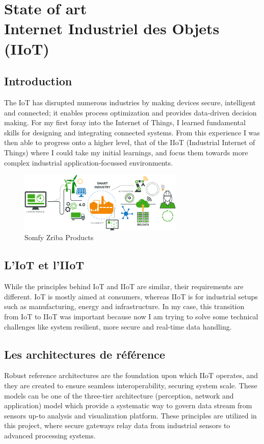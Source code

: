 
\chapter{ State of art \\
Internet Industriel des Objets (IIoT)}
\section{Introduction}
The IoT has disrupted numerous industries by making devices secure, intelligent and connected; it enables process optimization and provides data-driven decision making. For my first foray into the Internet of Things, I learned fundamental skills for designing and integrating connected systems. From this experience I was then able to progress onto a higher level, that of the IIoT (Industrial Internet of Things) where I could take my initial learnings, and focus them towards more complex industrial application-focussed environments.
\begin{figure}[H]
    \centering
    \includegraphics[width=0.7\textwidth]{chapters/N-1/img/what-is-industrial-Internet-of-things-1080x396.png}
    \caption{Somfy Zriba Products}
    \label{fig:campus}
\end{figure}

\section{L’IoT et l’IIoT}
While the principles behind IoT and IIoT are similar, their requirements are different. IoT is mostly aimed at consumers, whereas IIoT is for industrial setups such as manufacturing, energy and infrastructure. In my case, this transition from IoT to IIoT was important because now I am trying to solve some technical challenges like system resilient, more secure and real-time data handling.

\section{Les architectures de référence}
Robust reference architectures are the foundation upon which IIoT operates, and they are created to ensure seamless interoperability, securing system scale. These models can be one of the three-tier architecture (perception, network and application) model which provide a systematic way to govern data stream from sensors up-to analysis and visualization platform. These principles are utilized in this project, where secure gateways relay data from industrial sensors to advanced processing systems.

